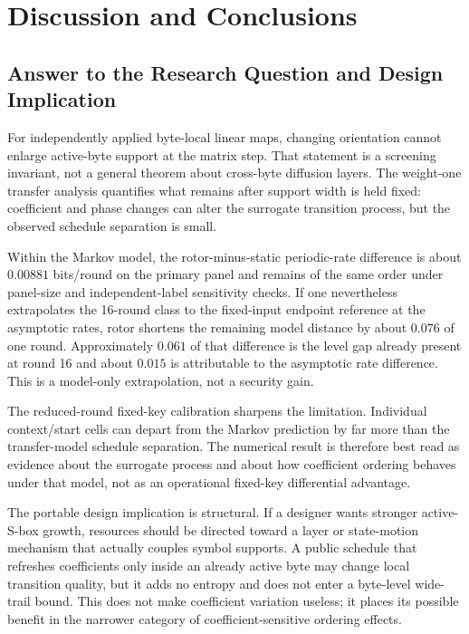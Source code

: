 \documentclass[cryptography,article,submit,oneauthor]{Definitions/mdpi}
\begin{document}
\section{Discussion and Conclusions}\label{sec:6}
\subsection{Answer to the Research Question and Design Implication}\label{sec:6-1}
For independently applied byte-local linear maps, changing orientation cannot enlarge active-byte support at the matrix step. That statement is a screening invariant, not a general theorem about cross-byte diffusion layers. The weight-one transfer analysis quantifies what remains after support width is held fixed: coefficient and phase changes can alter the surrogate transition process, but the observed schedule separation is small.

Within the Markov model, the rotor-minus-static periodic-rate difference is about $0.00881$ bits/round on the primary panel and remains of the same order under panel-size and independent-label sensitivity checks. If one nevertheless extrapolates the 16-round class to the fixed-input endpoint reference at the asymptotic rates, rotor shortens the remaining model distance by about $0.076$ of one round. Approximately $0.061$ of that difference is the level gap already present at round 16 and about $0.015$ is attributable to the asymptotic rate difference. This is a model-only extrapolation, not a security gain.

The reduced-round fixed-key calibration sharpens the limitation. Individual context/start cells can depart from the Markov prediction by far more than the transfer-model schedule separation. The numerical result is therefore best read as evidence about the surrogate process and about how coefficient ordering behaves under that model, not as an operational fixed-key differential advantage.

The portable design implication is structural. If a designer wants stronger active-S-box growth, resources should be directed toward a layer or state-motion mechanism that actually couples symbol supports. A public schedule that refreshes coefficients only inside an already active byte may change local transition quality, but it adds no entropy and does not enter a byte-level wide-trail bound. This does not make coefficient variation useless; it places its possible benefit in the narrower category of coefficient-sensitive ordering effects.
\end{document}
